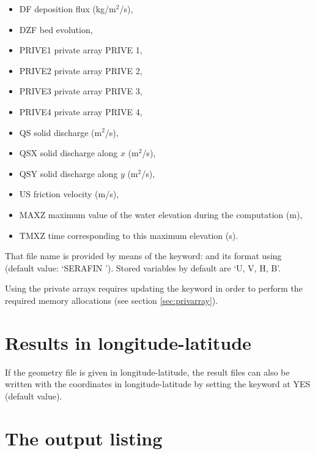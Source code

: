 \begin{itemize}
\item DF deposition flux (kg/m${}^{2}$/s),

\item DZF bed evolution,

\item PRIVE1 private array PRIVE 1,

\item PRIVE2 private array PRIVE 2,

\item PRIVE3 private array PRIVE 3,

\item PRIVE4 private array PRIVE 4,

\item QS  solid discharge (m${}^{2}$/s),

\item QSX  solid discharge along $x$ (m${}^{2}$/s),

\item QSY  solid discharge along $y$ (m${}^{2}$/s),

\item US  friction velocity (m/s),

\item MAXZ  maximum value of the water elevation during the computation (m),

\item TMXZ  time corresponding to this maximum elevation (s).
\end{itemize}

That file name is provided by means of the keyword:  and
its format using  (default value: `SERAFIN ').
Stored variables by default are `U, V, H, B'.

Using the private arrays requires updating the keyword  in order to perform the required memory allocations (see
section \ref{sec:privarray}).

\section{Results in longitude-latitude}
If the geometry file is given in longitude-latitude, the result files
can also be written with the coordinates in longitude-latitude
by setting the keyword 
at YES (default value).

\section{The output listing}


